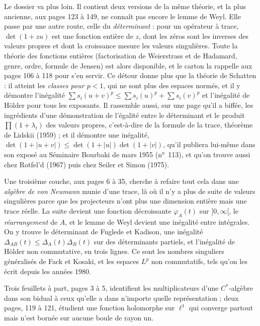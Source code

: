 \documentclass[11pt,a4paper]{article}
\begin{document}
\begin{resume}
Le dossier va plus loin. Il
contient deux versions de la même théorie, et la plus ancienne, aux pages
123 à 149, ne connaît pas encore le lemme de Weyl. Elle passe par une
autre route, celle du \emph{déterminant} : pour un opérateur à trace,
$\det(1 + zu)$ est une fonction entière de $z$, dont les zéros sont les
inverses des valeurs propres et dont la croissance mesure les valeurs
singulières. Toute la théorie des fonctions entières (factorisation de
Weierstrass et de Hadamard, genre, ordre, formule de Jensen) est alors
disponible, et le carton la rappelle aux pages 106 à 118 pour s'en servir.
Ce détour donne plus que la théorie de Schatten : il atteint les
\emph{classes pour $p < 1$}, qui ne sont plus des espaces normés, et il y
démontre l'inégalité $\sum s_i(u+v)^p \leq \sum s_i(u)^p + \sum s_i(v)^p$
et l'inégalité de Hölder pour tous les exposants. Il rassemble aussi, sur
une page qu'il a biffée, les ingrédients d'une démonstration de l'égalité
entre le déterminant et le produit $\prod(1 + \lambda_i)$ des valeurs
propres, c'est-à-dire de la formule de la trace, théorème de Lidskii (1959) ;
et il démontre une inégalité, $\det(1 + |u + v|) \leq \det(1 + |u|)\det(1 +
|v|)$, qu'il publiera lui-même dans son exposé au Séminaire Bourbaki de mars
1955 (n°~113), et qu'on trouve aussi chez Rotfel'd (1967) puis chez Seiler
et Simon (1975).

Une troisième couche, aux pages 6 à 35, cherche à refaire
tout cela dans une \emph{algèbre de von Neumann} munie d'une trace, là où
il n'y a plus de suite de valeurs singulières parce que les projecteurs
n'ont plus une dimension entière mais une trace réelle. La suite devient
une fonction décroissante $\varphi_A(t)$ sur $]0,\infty[$, le
\emph{réarrangement} de $A$, et le lemme de Weyl devient une inégalité
entre intégrales. On y trouve le déterminant de Fuglede et Kadison, une
inégalité $\Delta_{AB}(t) \leq \Delta_A(t)\Delta_B(t)$ sur des déterminants
partiels, et l'inégalité de Hölder non commutative, en trois lignes. Ce
sont les nombres singuliers généralisés de Fack et Kosaki, et les espaces
$L^p$ non commutatifs, tels qu'on les écrit depuis les années 1980.

Trois feuillets à part, pages 3 à 5, identifient les multiplicateurs d'une
$C^{*}$-algèbre dans son bidual à ceux qu'elle a dans n'importe quelle
représentation ; deux pages, 119 à 121, étudient une fonction holomorphe
sur $\ell^1$ qui converge partout mais n'est bornée sur aucune boule de
rayon un.


\end{resume}
\end{document}
